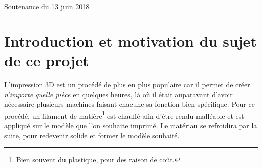 \documentclass[11pt]{article}
\begin{document}
\begin{titlepage}
	
	
	\vfill\vfill\vfill %
	
	{\large Soutenance du 13 juin 2018} %
	
	
	 
	
	\vfill %
	
\end{titlepage}

\section{Introduction et motivation du sujet de ce projet}

L'impression 3D est un procédé de plus en plus populaire car il permet de créer {\it n'importe quelle pièce} en quelques heures, là où il était auparavant d'avoir nécessaire plusieurs machines faisant chacune sa fonction bien spécifique. Pour ce procédé, un filament de matière\footnote{Bien souvent du plastique, pour des raison de coût.} est chauffé afin d'être rendu malléable et est appliqué sur le modèle que l'on souhaite imprimé. Le matériau se refroidira par la suite, pour redevenir solide et former le modèle souhaité. 
\end{document}
